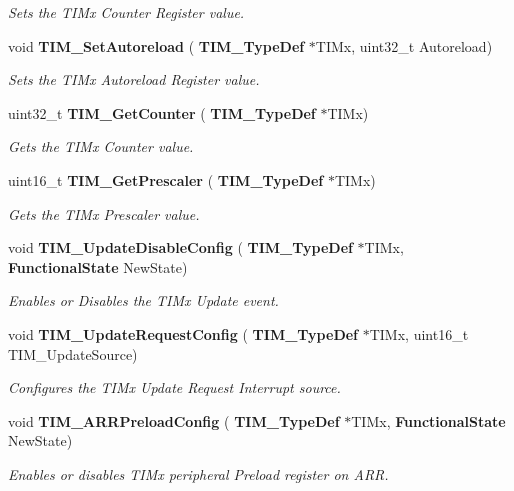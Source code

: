 \begin{DoxyCompactItemize}
\begin{DoxyCompactList}\small\item\em Sets the T\+I\+Mx Counter Register value. \end{DoxyCompactList}\item 
void \textbf{ T\+I\+M\+\_\+\+Set\+Autoreload} (\textbf{ T\+I\+M\+\_\+\+Type\+Def} $\ast$T\+I\+Mx, uint32\+\_\+t Autoreload)
\begin{DoxyCompactList}\small\item\em Sets the T\+I\+Mx Autoreload Register value. \end{DoxyCompactList}\item 
uint32\+\_\+t \textbf{ T\+I\+M\+\_\+\+Get\+Counter} (\textbf{ T\+I\+M\+\_\+\+Type\+Def} $\ast$T\+I\+Mx)
\begin{DoxyCompactList}\small\item\em Gets the T\+I\+Mx Counter value. \end{DoxyCompactList}\item 
uint16\+\_\+t \textbf{ T\+I\+M\+\_\+\+Get\+Prescaler} (\textbf{ T\+I\+M\+\_\+\+Type\+Def} $\ast$T\+I\+Mx)
\begin{DoxyCompactList}\small\item\em Gets the T\+I\+Mx Prescaler value. \end{DoxyCompactList}\item 
void \textbf{ T\+I\+M\+\_\+\+Update\+Disable\+Config} (\textbf{ T\+I\+M\+\_\+\+Type\+Def} $\ast$T\+I\+Mx, \textbf{ Functional\+State} New\+State)
\begin{DoxyCompactList}\small\item\em Enables or Disables the T\+I\+Mx Update event. \end{DoxyCompactList}\item 
void \textbf{ T\+I\+M\+\_\+\+Update\+Request\+Config} (\textbf{ T\+I\+M\+\_\+\+Type\+Def} $\ast$T\+I\+Mx, uint16\+\_\+t T\+I\+M\+\_\+\+Update\+Source)
\begin{DoxyCompactList}\small\item\em Configures the T\+I\+Mx Update Request Interrupt source. \end{DoxyCompactList}\item 
void \textbf{ T\+I\+M\+\_\+\+A\+R\+R\+Preload\+Config} (\textbf{ T\+I\+M\+\_\+\+Type\+Def} $\ast$T\+I\+Mx, \textbf{ Functional\+State} New\+State)
\begin{DoxyCompactList}\small\item\em Enables or disables T\+I\+Mx peripheral Preload register on A\+RR. \end{DoxyCompactList}\item 

\end{DoxyCompactItemize}
